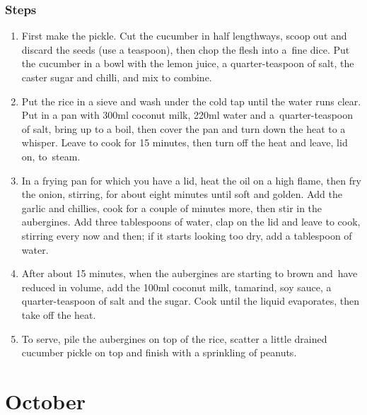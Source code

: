 \documentclass{book}
\begin{document}
\subsection*{Steps}
\begin{enumerate}
\item First make the pickle. Cut the cucumber in half lengthways, scoop out and discard the seeds (use a teaspoon), then chop the flesh into a fine dice. Put the cucumber in a bowl with the lemon juice, a quarter-teaspoon of salt, the caster sugar and chilli, and mix to combine.
\item Put the rice in a sieve and wash under the cold tap until the water runs clear. Put in a pan with 300ml coconut milk, 220ml water and a quarter-teaspoon of salt, bring up to a boil, then cover the pan and turn down the heat to a whisper. Leave to cook for 15 minutes, then turn off the heat and leave, lid on, to steam.
\item In a frying pan for which you have a lid, heat the oil on a high flame, then fry the onion, stirring, for about eight minutes until soft and golden. Add the garlic and chillies, cook for a couple of minutes more, then stir in the aubergines. Add three tablespoons of water, clap on the lid and leave to cook, stirring every now and then; if it starts looking too dry, add a tablespoon of water.
\item After about 15 minutes, when the aubergines are starting to brown and have reduced in volume, add the 100ml coconut milk, tamarind, soy sauce, a quarter-teaspoon of salt and the sugar. Cook until the liquid evaporates, then take off the heat.
\item To serve, pile the aubergines on top of the rice, scatter a little drained cucumber pickle on top and finish with a sprinkling of peanuts.
\end{enumerate}
\newpage

\chapter{October}
\end{document}
